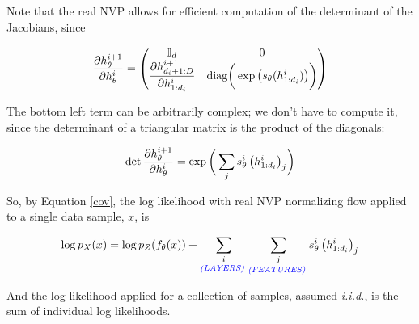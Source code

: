 \documentclass[10pt]{beamer}
\newcommand{\I}{\mathbb{I}}
\begin{document}
\begin{frame}
Note that the real NVP allows for efficient computation of the determinant of the Jacobians, since 

\[ \df{\partial h_\theta^{i+1}}{\partial h_\theta^{i}} = 
	\begin{pmatrix}
	\I_d & 0\\ 
	\df{\partial h_{d_i+1:D}^{i+1}}{\partial h_{1:d_i}^{i}} & \text{diag} \bigg( \exp \big( s_\theta (h^i_{1:d_i}) \big) \bigg) 
	\end{pmatrix}
\]

The bottom left term can be arbitrarily complex; we don't have to compute it, since the determinant of a triangular matrix is the product of the diagonals:

\[ \det \displaystyle\frac{\partial h_\theta^{i+1}}{\partial h_\theta^{i}} = \exp \bigg( \displaystyle\sum_j s_\theta^i \, \big( h^i_{1:d_i} \big)_j \bigg) \] 
\end{frame}

%

\begin{frame}
So, by Equation \ref{cov}, the log likelihood with real NVP normalizing flow applied to a single data sample, $x$, is

\[ \log p_X(x) = \log p_Z( f_\theta(x) ) + \underset{\textit{\color{blue}{(LAYERS)} \color{black}}}{\displaystyle\sum_i} \underset{\textit{\color{blue}{(FEATURES)} \color{black}}}{\displaystyle\sum_j} s_\theta^i \, \big( h^i_{1:d_i} \big)_j \] 


And the log likelihood applied for a collection of samples, assumed \textit{i.i.d.}, is the sum of individual log likelihoods. 
\end{frame}
 
\end{document}
